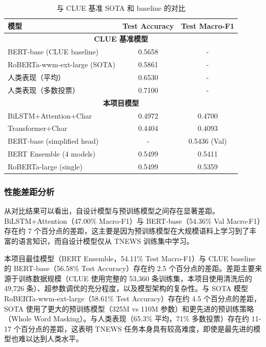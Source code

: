\documentclass[a4paper]{article}
\begin{document}
\begin{table}[H]
    \centering
    \small
    \begin{tabular}{|l|c|c|}
        \hline
        \textbf{模型} & \textbf{Test Accuracy} & \textbf{Test Macro-F1} \\
        \hline
        \multicolumn{3}{|c|}{\textbf{CLUE 基准模型}} \\
        \hline
        BERT-base (CLUE baseline) & 0.5658 & - \\
        RoBERTa-wwm-ext-large (SOTA) & 0.5861 & - \\
        人类表现（平均） & 0.6530 & - \\
        人类表现（多数投票） & 0.7100 & - \\
        \hline
        \multicolumn{3}{|c|}{\textbf{本项目模型}} \\
        \hline
        BiLSTM+Attention+Char & 0.4972 & 0.4700 \\
        Transformer+Char & 0.4404 & 0.4093 \\
        BERT-base (simplified head) & - & 0.5436 (Val) \\
        BERT Ensemble (4 models) & 0.5499 & 0.5411 \\
        RoBERTa-large (single) & 0.5499 & 0.5359 \\
        \hline
    \end{tabular}
    \caption{与 CLUE 基准 SOTA 和 baseline 的对比}
    \label{tab:comparison}
\end{table}

\subsubsection{性能差距分析}

从对比结果可以看出，自设计模型与预训练模型之间存在显著差距。BiLSTM+Attention（47.00\% Macro-F1）与 BERT-base（54.36\% Val Macro-F1）存在约 7 个百分点的差距，这主要是因为预训练模型在大规模语料上学习到了丰富的语言知识，而自设计模型仅从 TNEWS 训练集中学习。

本项目最佳模型（BERT Ensemble，54.11\% Test Macro-F1）与 CLUE baseline 的 BERT-base（56.58\% Test Accuracy）存在约 2.5 个百分点的差距。差距主要来源于训练数据规模（CLUE 使用完整的 53,360 条训练集，本项目使用清洗后的 49,726 条）、超参数调优的充分程度，以及模型架构的复杂性。与 SOTA 模型 RoBERTa-wwm-ext-large（58.61\% Test Accuracy）存在约 4.5 个百分点的差距，SOTA 使用了更大的预训练模型（325M vs 110M 参数）和更先进的预训练策略（Whole Word Masking）。与人类表现（65.3\% 平均，71\% 多数投票）存在约 11-17 个百分点的差距，这表明 TNEWS 任务本身具有较高难度，即使是最先进的模型也难以达到人类水平。
\end{document}

